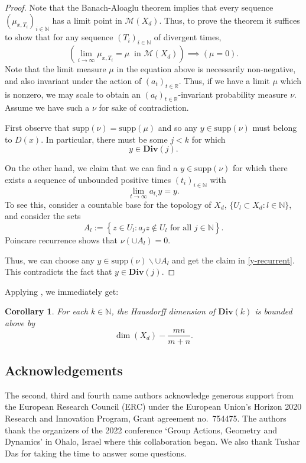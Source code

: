 \documentclass[reqno,11pt]{amsart}
\theoremstyle{plain}
\newtheorem{cor}[thm]{Corollary}
\theoremstyle{definition}
\theoremstyle{remark}
\numberwithin{equation}{section}
\newcommand{\D}{\mathbf{Div}}
\newcommand{\R}{{\mathbb{R}}}
\newcommand{\N}{{\mathbb{N}}}
\begin{document}
\begin{proof}
Note that the Banach-Aloaglu theorem implies that every sequence $(\mu_{x,T_i})_{i \in \N}$ has a limit point in $\mathcal{M}(X_d)$.
Thus, to prove the theorem it suffices to show that for any sequence $(T_i)_{i \in \N}$ of divergent times, 
\begin{equation}
   \left( \lim_{i \to \infty}\mu_{x,T_i} = \mu\ \text{ in } \mathcal{M}(X_d) \right) \implies \left(\mu = 0\right).
\end{equation}
Note that the limit measure $\mu$ in the equation above is necessarily non-negative, and also invariant under the action of $(a_t)_{t \in \R}$.
Thus, if we have a limit $\mu$ which is nonzero, we may scale to obtain an $(a_t)_{t \in \R}$-invariant probability measure $\nu$.
Assume we have such a $\nu$ for sake of contradiction.

First observe that $\text{supp}(\nu) = \text{supp}(\mu)$ and so any $y \in \text{supp}(\nu)$  must belong to $D(x)$. In particular, there must be some $j<k$ for which
\begin{equation*}
    y \in \D(j).
\end{equation*}

On the other hand, we claim that we can find a $y \in \text{supp}(\nu)$ for which there exists a sequence of unbounded positive times $(t_i)_{i \in \N}$ with 
\begin{equation}\label{y-recurrent}
    \lim_{t \to \infty} a_{t_i}y = y.
\end{equation}
To see this, consider a countable base for the topology of $X_d$, $\{U_l \subset X_d: l \in \N\}$, and consider the sets
\begin{equation*}
    A_l := \left\lbrace z \in U_l : a_{j} z \notin U_l \text{ for all } j \in \N \right\rbrace.
\end{equation*}
Poincare recurrence shows that $\nu\left(\cup A_l\right) = 0$.

Thus, we can choose any $y \in \text{supp}(\nu) \smallsetminus \cup A_l$ and get the claim in \eqref{y-recurrent}.
This contradicts the fact that $y \in \D(j)$.
\end{proof}
Applying \cite[Theorem 1.1]{KKLM}, we immediately get:
\begin{cor}\label{upper-bound-cor}
For each $k \in \N$, the Hausdorff dimension of $\D(k)$ is bounded above by
\begin{equation*}
    \dim(X_d) - \frac{mn}{m+n}.
\end{equation*}
\end{cor}

\subsection*{Acknowledgements}
The second, third and fourth name authors acknowledge generous support from the European Research Council (ERC) under the European Union’s Horizon 2020 Research and Innovation Program, Grant agreement no.\ 754475.
The authors thank the organizers of the 2022 conference `Group Actions, Geometry and Dynamics' in Ohalo, Israel where this collaboration began. We also thank Tushar Das for taking the time to answer some questions.



\end{document}
